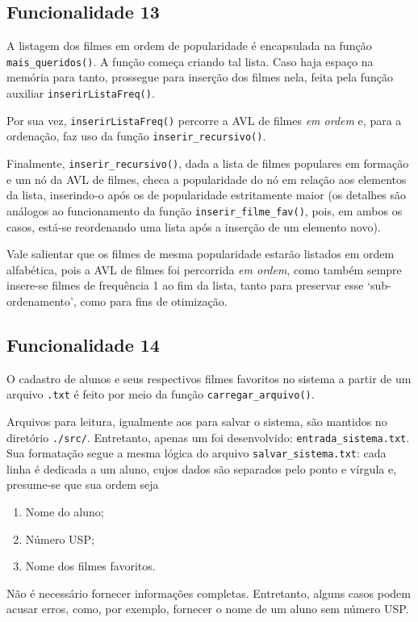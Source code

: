 \documentclass[12pt,a4paper,portuguese]{article}
\begin{document}
    \subsection*{Funcionalidade 13}
        A listagem dos filmes em ordem de popularidade é encapsulada na função \verb|mais_queridos()|. A função começa criando tal lista. Caso haja espaço na memória para tanto, prossegue para inserção dos filmes nela, feita pela função auxiliar \verb|inserirListaFreq()|.

        Por sua vez, \verb|inserirListaFreq()| percorre a AVL de filmes \textit{em ordem} e, para a ordenação, faz uso da função \verb|inserir_recursivo()|.

        Finalmente, \verb|inserir_recursivo()|, dada a lista de filmes populares em formação e um nó da AVL de filmes, checa a popularidade do nó em relação aos elementos da lista, inserindo-o após os de popularidade estritamente maior (os detalhes são análogos ao funcionamento da função \verb|inserir_filme_fav()|, pois, em ambos os casos, está-se reordenando uma lista após a inserção de um elemento novo).

        Vale salientar que os filmes de mesma popularidade estarão listados em ordem alfabética, pois a AVL de filmes foi percorrida \textit{em ordem}, como também sempre insere-se filmes de frequência 1 ao fim da lista, tanto para preservar esse `sub-ordenamento', como para fins de otimização.

    \subsection*{Funcionalidade 14}
        O cadastro de alunos e seus respectivos filmes favoritos no sistema a partir de um arquivo \verb|.txt| é feito por meio da função \verb|carregar_arquivo()|.

        Arquivos para leitura, igualmente aos para salvar o sistema, são mantidos no diretório \verb|./src/|. Entretanto, apenas um foi desenvolvido: \verb|entrada_sistema.txt|. Sua formatação segue a mesma lógica do arquivo \verb|salvar_sistema.txt|: cada linha é dedicada a um aluno, cujos dados são separados pelo ponto e vírgula e, presume-se que sua ordem seja
\begin{multicols}{3}
        \begin{enumerate}
            \item Nome do aluno;
            \item Número USP;
            \item Nome dos filmes favoritos.
        \end{enumerate}
\end{multicols}
        Não é necessário fornecer informações completas. Entretanto, alguns casos podem acusar erros, como, por exemplo, fornecer o nome de um aluno sem número USP.
\end{document}
